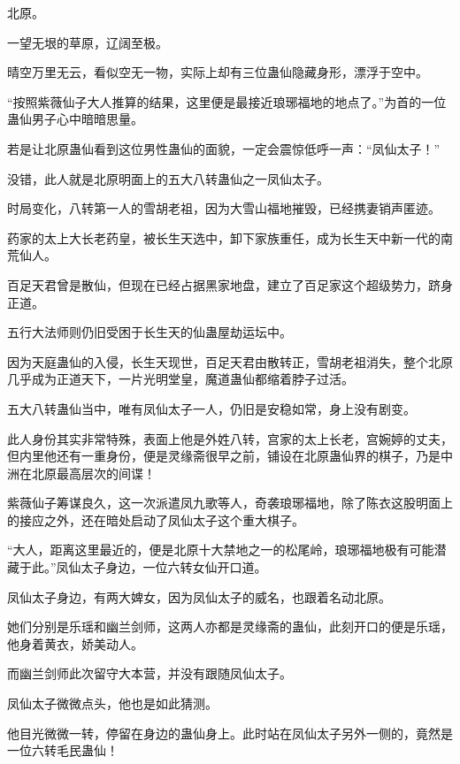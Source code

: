 
\begin{this_body}

北原。

一望无垠的草原，辽阔至极。

晴空万里无云，看似空无一物，实际上却有三位蛊仙隐藏身形，漂浮于空中。

“按照紫薇仙子大人推算的结果，这里便是最接近琅琊福地的地点了。”为首的一位蛊仙男子心中暗暗思量。

若是让北原蛊仙看到这位男性蛊仙的面貌，一定会震惊低呼一声：“凤仙太子！”

没错，此人就是北原明面上的五大八转蛊仙之一凤仙太子。

时局变化，八转第一人的雪胡老祖，因为大雪山福地摧毁，已经携妻销声匿迹。

药家的太上大长老药皇，被长生天选中，卸下家族重任，成为长生天中新一代的南荒仙人。

百足天君曾是散仙，但现在已经占据黑家地盘，建立了百足家这个超级势力，跻身正道。

五行大法师则仍旧受困于长生天的仙蛊屋劫运坛中。

因为天庭蛊仙的入侵，长生天现世，百足天君由散转正，雪胡老祖消失，整个北原几乎成为正道天下，一片光明堂皇，魔道蛊仙都缩着脖子过活。

五大八转蛊仙当中，唯有凤仙太子一人，仍旧是安稳如常，身上没有剧变。

此人身份其实非常特殊，表面上他是外姓八转，宫家的太上长老，宫婉婷的丈夫，但内里他还有一重身份，便是灵缘斋很早之前，铺设在北原蛊仙界的棋子，乃是中洲在北原最高层次的间谍！

紫薇仙子筹谋良久，这一次派遣凤九歌等人，奇袭琅琊福地，除了陈衣这股明面上的接应之外，还在暗处启动了凤仙太子这个重大棋子。

“大人，距离这里最近的，便是北原十大禁地之一的松尾岭，琅琊福地极有可能潜藏于此。”凤仙太子身边，一位六转女仙开口道。

凤仙太子身边，有两大婢女，因为凤仙太子的威名，也跟着名动北原。

她们分别是乐瑶和幽兰剑师，这两人亦都是灵缘斋的蛊仙，此刻开口的便是乐瑶，他身着黄衣，娇美动人。

而幽兰剑师此次留守大本营，并没有跟随凤仙太子。

凤仙太子微微点头，他也是如此猜测。

他目光微微一转，停留在身边的蛊仙身上。此时站在凤仙太子另外一侧的，竟然是一位六转毛民蛊仙！


\end{this_body}

